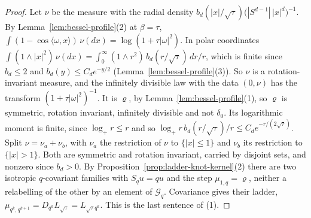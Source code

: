 \begin{proof}
Let $\nu$ be the measure with the radial density
$b_d(|x|/\sqrt\tau)\bigl(|S^{d-1}|\,|x|^d\bigr)^{-1}$. By Lemma~\ref{lem:bessel-profile}(2) at
$\beta = \tau$, $\int(1 - \cos\langle\omega, x\rangle)\,\nu(dx) = \log(1 + \tau|\omega|^2)$.
In polar coordinates $\int(1 \wedge |x|^2)\,\nu(dx) = \int_0^\infty(1 \wedge r^2)\,b_d(r/\sqrt\tau)\,dr/r$,
which is finite since $b_d \le 2$ and $b_d(y) \le C_de^{-y/2}$ (Lemma~\ref{lem:bessel-profile}(3)).
So $\nu$ is a rotation-invariant \Levy{} measure, and the infinitely divisible law with the data
$(0, \nu)$ has the transform $(1 + \tau|\omega|^2)^{-1}$. It is $\varrho$, by
Lemma~\ref{lem:bessel-profile}(1), so $\varrho$ is symmetric, rotation invariant, infinitely
divisible and not $\delta_0$. Its logarithmic moment is finite, since $\log_+ r \le r$ and so
$\log_+ r\,b_d(r/\sqrt\tau)/r \le C_d e^{-r/(2\sqrt\tau)}$. Split $\nu = \nu_a + \nu_b$, with
$\nu_a$ the restriction of $\nu$ to $\{|x| \le 1\}$ and $\nu_b$ its restriction to $\{|x| > 1\}$.
Both are symmetric and rotation invariant, carried by disjoint sets, and nonzero since $b_d > 0$.
By Proposition~\ref{prop:ladder-knot-kernel}(2) there are two isotropic $q$-covariant families
with $S_qu = qu$ and the step $\mu_{1,q} = \varrho$, neither a relabelling of the other by an
element of $\mathcal{G}_q$. Covariance gives their ladder,
$\mu_{q^k,q^{k+1}} = D_{q^k}L_{\sqrt\tau} = L_{\sqrt\tau q^k}$. This is the last sentence of (1).


\end{proof}
